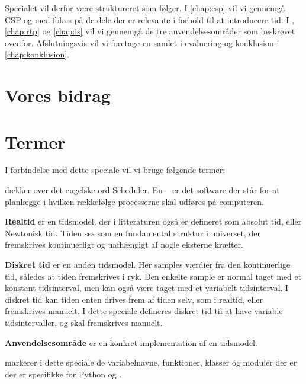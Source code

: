 Specialet vil derfor være struktureret som følger. I \autoref{chap:csp} vil vi gennemgå CSP og \pycsp med fokus på de dele der er relevante i forhold til at introducere tid. I , \ref{chap:rtp} og \ref{chap:is} vil vi gennemgå de tre anvendelsesområder som beskrevet ovenfor. Afslutningsvis vil vi foretage en samlet i evaluering og konklusion i \autoref{chap:konklusion}.



\section{Vores bidrag}
\section{Termer}
I forbindelse med dette speciale vil vi bruge følgende termer:
\begin{list}{}{}
\item \textbf{\Sched} dækker over det engelske ord Scheduler. En \sched~ er det software der står for at planlægge i hvilken rækkefølge processerne skal udføres på computeren.
\item \textbf{Realtid} er en tidsmodel, der i litteraturen også er defineret som absolut tid, eller Newtonisk tid. Tiden ses som en fundamental struktur i universet, der 
fremskrives kontinuerligt og uafhængigt af nogle eksterne kræfter.
\item \textbf{Diskret tid} er en anden tidsmodel. Her samples værdier fra den kontinuerlige tid, således at tiden fremskrives i ryk. Den enkelte sample er normal taget med et konstant tidsinterval, men kan også være taget med et variabelt tidsinterval. I diskret tid kan tiden enten drives frem af tiden selv, som i realtid, eller fremskrives manuelt. I dette speciale defineres diskret tid til at have variable tidsintervaller, og skal fremskrives manuelt.
\item \textbf{Anvendelsesområde} er en konkret implementation af en tidsmodel.
\item \textbf{} markerer i dette speciale de  variabelnavne, funktioner,  klasser og moduler der er der er specifikke for Python og \pycsp.
\end{list}



